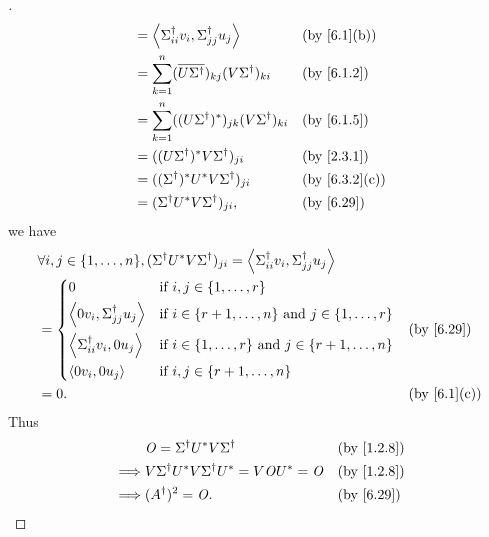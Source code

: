 \begin{proof}[]
\begin{align*}
             & = \inn{\Sigma_{i i}^{\dag} v_i, \Sigma_{j j}^{\dag} u_j}                &  & \by{6.1}[b]       \\
             & = \sum_{k = 1}^n (\conj{U \Sigma^{\dag}})_{k j} (V \Sigma^{\dag})_{k i} &  & \by{6.1.2}        \\
             & = \sum_{k = 1}^n ((U \Sigma^{\dag})^*)_{j k} (V \Sigma^{\dag})_{k i}    &  & \by{6.1.5}        \\
             & = ((U \Sigma^{\dag})^* V \Sigma^{\dag})_{j i}                           &  & \by{2.3.1}        \\
             & = ((\Sigma^{\dag})^* U^* V \Sigma^{\dag})_{j i}                         &  & \by{6.3.2}[c]     \\
             & = (\Sigma^{\dag} U^* V \Sigma^{\dag})_{j i},                            &  & \by{6.29}
  \end{align*}
  we have
  \begin{align*}
     & \forall i, j \in \set{1, \dots, n}, (\Sigma^{\dag} U^* V \Sigma^{\dag})_{j i} = \inn{\Sigma_{i i}^{\dag} v_i, \Sigma_{j j}^{\dag} u_j}                  \\
     & = \begin{dcases}
           0                                    & \text{if } i, j \in \set{1, \dots, r}                                       \\
           \inn{0 v_i, \Sigma_{j j}^{\dag} u_j} & \text{if } i \in \set{r + 1, \dots, n} \text{ and } j \in \set{1, \dots, r} \\
           \inn{\Sigma_{i i}^{\dag} v_i, 0 u_j} & \text{if } i \in \set{1, \dots, r} \text{ and } j \in \set{r + 1, \dots, n} \\
           \inn{0 v_i, 0 u_j}                   & \text{if } i, j \in \set{r + 1, \dots, n}
         \end{dcases}              &  & \by{6.29}                                \\
     & = 0.                                                                                                                                   &  & \by{6.1}[c]
  \end{align*}
  Thus
  \begin{align*}
             & \zm = \Sigma^{\dag} U^* V \Sigma^{\dag}                   &  & \by{1.2.8} \\
    \implies & V \Sigma^{\dag} U^* V \Sigma^{\dag} U^* = V \zm U^* = \zm &  & \by{1.2.8} \\
    \implies & (A^{\dag})^2 = \zm.                                       &  & \by{6.29}
  \end{align*}
\end{proof}

